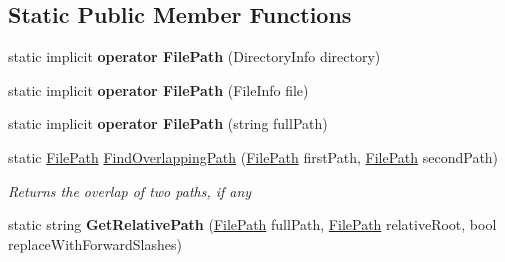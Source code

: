 \subsection*{Static Public Member Functions}
\begin{DoxyCompactItemize}
\item 
\hypertarget{class_cloud_api_public_1_1_model_1_1_file_path_a207de9e47985b6aebd7ff55402cad10c}{static implicit {\bfseries operator File\-Path} (Directory\-Info directory)}\label{class_cloud_api_public_1_1_model_1_1_file_path_a207de9e47985b6aebd7ff55402cad10c}

\item 
\hypertarget{class_cloud_api_public_1_1_model_1_1_file_path_a487405c44f1fdfb000153cff0b5fb82c}{static implicit {\bfseries operator File\-Path} (File\-Info file)}\label{class_cloud_api_public_1_1_model_1_1_file_path_a487405c44f1fdfb000153cff0b5fb82c}

\item 
\hypertarget{class_cloud_api_public_1_1_model_1_1_file_path_a02e6124740c2197434373db93c843932}{static implicit {\bfseries operator File\-Path} (string full\-Path)}\label{class_cloud_api_public_1_1_model_1_1_file_path_a02e6124740c2197434373db93c843932}

\item 
static \hyperlink{class_cloud_api_public_1_1_model_1_1_file_path}{File\-Path} \hyperlink{class_cloud_api_public_1_1_model_1_1_file_path_a546fa862491a9ac6f9f27fefcdcc8e70}{Find\-Overlapping\-Path} (\hyperlink{class_cloud_api_public_1_1_model_1_1_file_path}{File\-Path} first\-Path, \hyperlink{class_cloud_api_public_1_1_model_1_1_file_path}{File\-Path} second\-Path)
\begin{DoxyCompactList}\small\item\em Returns the overlap of two paths, if any \end{DoxyCompactList}\item 
\hypertarget{class_cloud_api_public_1_1_model_1_1_file_path_ae59cc87c9025226cd9c00578c4b7b453}{static string {\bfseries Get\-Relative\-Path} (\hyperlink{class_cloud_api_public_1_1_model_1_1_file_path}{File\-Path} full\-Path, \hyperlink{class_cloud_api_public_1_1_model_1_1_file_path}{File\-Path} relative\-Root, bool replace\-With\-Forward\-Slashes)}\label{class_cloud_api_public_1_1_model_1_1_file_path_ae59cc87c9025226cd9c00578c4b7b453}


\end{DoxyCompactItemize}
